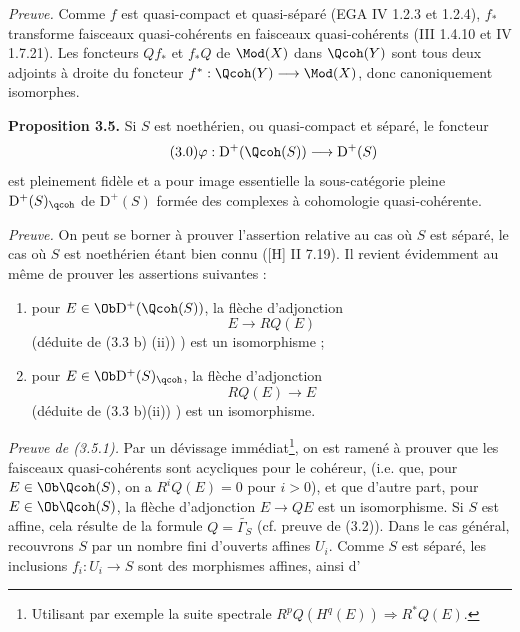 \emph{Preuve.} Comme $f$ est quasi-compact et quasi-séparé (EGA IV 1.2.3 et 1.2.4), $f_*$ transforme faisceaux quasi-cohérents en faisceaux quasi-cohérents (III 1.4.10 et IV 1.7.21). Les foncteurs $Qf_*$ et $f_*Q$ de $\Mod(X)$ dans $\Qcoh(Y)$ sont tous deux adjoints à droite du foncteur $f^*:\Qcoh(Y)\longrightarrow\Mod(X)$, donc canoniquement isomorphes.

\textbf{Proposition 3.5.} Si $S$ est noethérien, ou quasi-compact et séparé, le foncteur
\begin{equation}\tag{3.0}
 \varphi:\mathrm D^+(\Qcoh(S))\longrightarrow \mathrm D^+(S)
\end{equation}
est pleinement fidèle et a pour image essentielle la sous-catégorie pleine $\mathrm D^+(S)_{\qcoh}$ de $\mathrm D^+(S)$ formée des complexes à cohomologie quasi-cohérente.

\emph{Preuve.} On peut se borner à prouver l'assertion relative au cas où $S$ est séparé, le cas où $S$ est noethérien étant bien connu ([H] II 7.19). Il revient évidemment au même de prouver les assertions suivantes :

\begin{enumerate}[label={(3.5.\arabic*)~:}]
\item pour $E\in\Ob\mathrm D^+(\Qcoh(S))$, la flèche d'adjonction
\[
 E\longrightarrow RQ(E)
\]
(déduite de (3.3 b) (ii)) ) est un isomorphisme ;
\item pour $E\in\Ob\mathrm D^+(S)_{\qcoh}$, la flèche d'adjonction
\[
 RQ(E)\longrightarrow E
\]
(déduite de (3.3 b)(ii)) ) est un isomorphisme.
\end{enumerate}

\emph{Preuve de (3.5.1).} Par un dévissage immédiat\footnote{Utilisant par exemple la suite spectrale $R^pQ(H^q(E))\Longrightarrow R^{*}Q(E)$.}, on est ramené à prouver que les faisceaux quasi-cohérents sont acycliques pour le cohéreur, (i.e. que, pour $E\in\Ob\Qcoh(S)$, on a $R^iQ(E)=0$ pour $i>0$), et que d'autre part, pour $E\in\Ob\Qcoh(S)$, la flèche d'adjonction $E\longrightarrow QE$ est un isomorphisme. Si $S$ est affine, cela résulte de la formule $Q=\widetilde{\Gamma_S}$ (cf. preuve de (3.2)). Dans le cas général, recouvrons $S$ par un nombre fini d'ouverts affines $U_i$. Comme $S$ est séparé, les inclusions $f_i:U_i\longrightarrow S$ sont des morphismes affines, ainsi d'%

